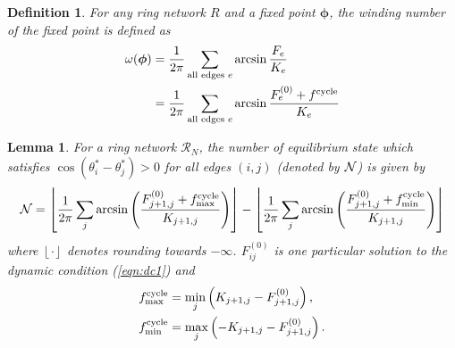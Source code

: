 \documentclass[10pt,aps,pre,preprint,superscriptaddress]{revtex4-1}
\newtheorem{defn}[thm]{Definition}
\newcommand{\nn}{\nonumber}
\newcommand{\N}{{\cal N}}
\renewcommand{\vec}[1]{\boldsymbol{#1}}
\newcommand{\R}{\mathcal{R}}
\newcommand{\floor}[1]{\left\lfloor #1 \right \rfloor}
\newtheorem{lemma}{Lemma}
\begin{document}
\begin{defn}
For any ring network $R$ and a fixed point $\vec{\phi}$, the \emph{winding 
number of the fixed point} is defined as 
\begin{align}
\label{def:wnum}
\omega(\vec{\phi})&=\frac{1}{2\pi}\sum_{\text{all edges }e} \arcsin{\frac{F_e}{K_e}}\\
&=\frac{1}{2\pi}\sum_{\text{all edges }e} \arcsin{\frac{F_e^{(0)}+f^{\rm cycle}}{K_e}}
\end{align}
\end{defn}



\begin{lemma}
\label{lemma-cycle}
For a ring network $\R_N$, the number of equilibrium state which satisfies 
$\cos(\theta_i^*  - \theta_j^*) > 0$ for all edges $(i,j)$  (denoted by $\N$)
is given by 
\begin{align}   
   \N =  \floor{\frac{1}{2\pi} \sum_j\arcsin\left(\frac{F_{j+1,j}^{(0)}+f^{\rm cycle}_{\rm max}}{K_{j+1,j}}\right) }
    - \floor{\frac{1}{2\pi}\sum_j\arcsin\left(\frac{F_{j+1,j}^{(0)}+f^{\rm cycle}_{\rm min}}{K_{j+1,j}}\right) }
\end{align}
where $\floor{\cdot}$ denotes rounding towards $-\infty$.
$F_{ij}^{(0)}$ is one particular solution to the dynamic condition (\ref{eqn:dc1})
and
\begin{align}
   \label{eqn:def-Fmaxmin}
   f^{\rm cycle}_{\rm max} &= \min_j \left( K _{j+1,j} - F_{j+1,j}^{(0)} \right), \nn \\
   f^{\rm cycle}_{\rm min} &= \max_j  \left( - K _{j+1,j} - F_{j+1,j}^{(0)} \right).
\end{align}
\end{lemma}
\end{document}
